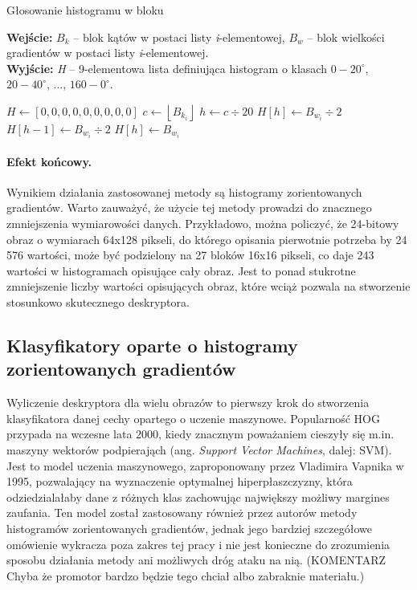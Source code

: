 \documentclass[12pt,a4paper,leqno,oneside,titlepage]{book}
\begin{document}
\begin{algorithm}
\caption{Głosowanie histogramu w bloku}
\hspace*{\algorithmicindent} \textbf{Wejście:} $B_{k}$ -- blok kątów w postaci listy \textit{i}-elementowej, $B_w$ -- blok wielkości gradientów w postaci listy \textit{i}-elementowej. \\
\hspace*{\algorithmicindent} \textbf{Wyjście: } \textit{H} -- 9-elementowa lista definiująca histogram o klasach $0-20^{\circ}$, $20-40^{\circ}$, ..., $160-0^{\circ}.$ 

\begin{algorithmic}
\State $H\gets [0, 0, 0, 0, 0, 0, 0, 0, 0]$
  \State $c\gets \left\lfloor{B_{k_{i}}}\right\rfloor$
  \State $h\gets c\div 20$
    \State $H[h]\gets B_{w_{i}}\div 2$
    \State $H[h-1]\gets B_{w_{i}}\div 2$
  \Else
    \State $H[h]\gets B_{w_{i}}$
  \EndIf
\EndFor
\end{algorithmic}
\end{algorithm}

\paragraph{Efekt końcowy.}
Wynikiem działania zastosowanej metody są histogramy zorientowanych gradientów. Warto zauważyć, że użycie tej metody prowadzi do znacznego zmniejszenia wymiarowości danych. Przykładowo, można policzyć, że 24-bitowy obraz o wymiarach 64x128 pikseli, do którego opisania pierwotnie potrzeba by 24 576 wartości, może być podzielony na 27 bloków 16x16 pikseli, co daje 243 wartości w histogramach opisujące cały obraz. Jest to ponad stukrotne zmniejszenie liczby wartości opisujących obraz, które wciąż pozwala na stworzenie stosunkowo skutecznego deskryptora.\cite{DalalTriggs05Hog}

\subsection{Klasyfikatory oparte o histogramy zorientowanych gradientów}

Wyliczenie deskryptora dla wielu obrazów to pierwszy krok do stworzenia klasyfikatora danej cechy opartego o uczenie maszynowe. Popularność HOG przypada na wczesne lata 2000, kiedy znacznym poważaniem cieszyły się m.in. maszyny wektorów podpierająch (ang. \textit{Support Vector Machines}, dalej: SVM). Jest to model uczenia maszynowego, zaproponowany przez Vladimira Vapnika w 1995, pozwalający na wyznaczenie optymalnej hiperpłaszczyzny, która odziedzialałaby dane z różnych klas zachowując największy możliwy margines zaufania.\cite{Norbert03,Vapnik95} Ten model został zastosowany również przez autorów metody histogramów zorientowanych gradientów\cite{DalalTriggs05Hog}, jednak jego bardziej szczegółowe omówienie wykracza poza zakres tej pracy i nie jest konieczne do zrozumienia sposobu działania metody ani możliwych dróg ataku na nią. (KOMENTARZ Chyba że promotor bardzo będzie tego chciał albo zabraknie materiału.)
\end{document}
